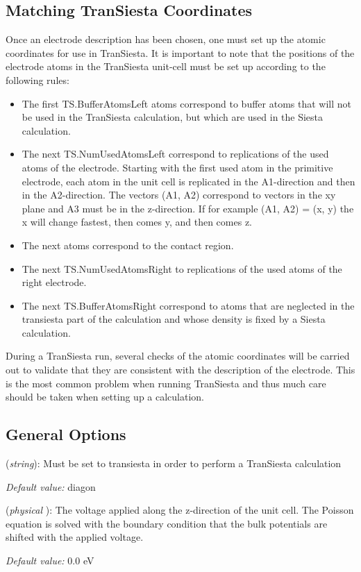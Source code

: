 \documentclass[11pt]{article}
\begin{document}
\subsection{  Matching   {\sc TranSiesta} Coordinates}
Once an electrode description has been chosen, one must set up the atomic coordinates 
for use in {\sc TranSiesta}. It is important to note that the positions of the electrode atoms 
in the {\sc TranSiesta} unit-cell must be set up according to the following rules:
\begin{itemize}
\item
The first TS.BufferAtomsLeft atoms correspond to buffer atoms that will not be used in the  
{\sc TranSiesta} calculation, but which are used in the  {\sc Siesta} calculation.
\item The next TS.NumUsedAtomsLeft correspond to 
replications of the used atoms of the electrode. Starting with the first used atom in the 
primitive electrode, each atom in the unit cell is replicated in the A1-direction and then in 
the A2-direction. The vectors (A1, A2) correspond to vectors in the xy plane and A3 must be in 
the z-direction. If for example (A1, A2) = (x, y) the x will change fastest, then comes y, 
and then comes z.
\item  The next atoms correspond to the contact region.
\item  The next TS.NumUsedAtomsRight to replications of the used atoms of the right electrode.
\item  The next TS.BufferAtomsRight correspond to atoms that are neglected in the transiesta part of 
the calculation and whose density is fixed by a  {\sc Siesta} calculation.
\end{itemize}

During a {\sc TranSiesta} run, several checks of the atomic coordinates will be carried out to validate 
that they are consistent with the description of the electrode. This is the most common problem 
when running {\sc TranSiesta} and thus much care should be taken when setting up a calculation.

\subsection{General Options}

\begin{description}
    \itemsep 10pt
    \parsep 0pt

    \item[{\bf SolutionMethod}] ({\it string}): 
        Must be set to transiesta in order to perform a {\sc TranSiesta} calculation

        {\it Default value:} diagon

    \item[{\bf TS.Voltage}] ({\it physical }): 
        The voltage applied along the z-direction of the unit cell.
        The Poisson equation is solved with the boundary condition that the 
        bulk potentials are shifted with the applied voltage.

        {\it Default value:} 0.0 eV

\end{description}
\end{document}
